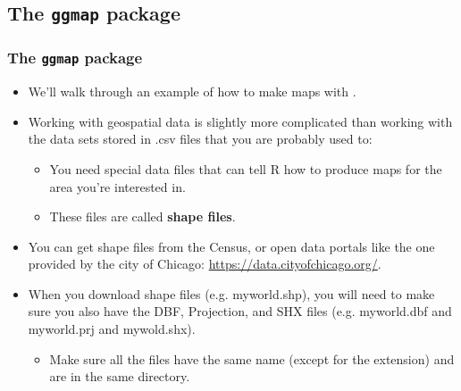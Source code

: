 \documentclass{beamer}
\begin{document}
\subsection{The \small\texttt{ggmap} \normalsize package}

\begin{frame}[allowframebreaks]
 \frametitle{The \Large\texttt{ggmap} package}
 
	\begin{itemize}
	    \item
	    We'll walk through an example of how to make maps with .
	    \vfill
	    \item
	    Working with geospatial data is slightly more complicated than working with the data sets stored in .csv files that you are probably used to:
	    \begin{itemize}
	        \item
	        You need special data files that can tell R how to produce maps for the area you're interested in.
	        \item
	        These files are called \textbf{shape files}.
	        \vfill
	    \end{itemize}
	    \item
	    You can get shape files from the Census, or open data portals like the one provided by the city of Chicago: \scriptsize\url{https://data.cityofchicago.org/}\normalsize.
	    \vfill
	    \item
	    When you download shape files (e.g. myworld.shp), you will need to make sure you also have the DBF, Projection, and SHX files (e.g. myworld.dbf and myworld.prj and mywold.shx).
	    \begin{itemize}
	        \item
	        Make sure all the files have the same name (except for the extension) and are in the same directory.
        \end{itemize}
	\end{itemize}
	

\end{frame}
\end{document}
